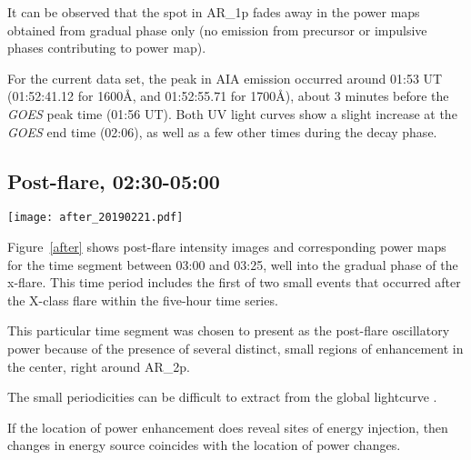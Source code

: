 It can be observed that the spot in AR\_1p fades away in the power maps
obtained from gradual phase only (no emission from precursor or impulsive
phases contributing to power map).


For the current data set, the peak in AIA emission occurred around
01:53 UT (01:52:41.12 for 1600\AA{}, and 01:52:55.71 for 1700\AA{}),
about 3 minutes before the \textit{GOES} peak time (01:56 UT).
Both UV light curves show a slight increase at the \textit{GOES} end time
(02:06), as well as a few other times during the decay phase.



\clearpage
\subsection{Post-flare, 02:30-05:00}

\begin{figure*}[htb!]\centering
    \texttt{[image: after\_20190221.pdf]}
    \caption{%
        Same as Figure~\ref{before},
        after the X-class flare between
        03:00 and 03:25 UT on 15 February 2011.
        \label{after}}
\end{figure*}

Figure~\ref{after}
shows post-flare intensity images and corresponding power maps for
the time segment between 03:00 and 03:25,
well into the gradual phase of the x-flare.
This time period includes the first of two small events that occurred
after the X-class flare within the five-hour time series.

This particular time segment was chosen to present as the post-flare
oscillatory power because of the presence of several distinct, small
regions of enhancement in the center,
right around AR\_2p.






%


The small periodicities can be difficult to extract from the global
lightcurve \citep{VanDoorsselaere2016}.

If the location of power enhancement does reveal sites of energy injection,
then  changes in energy source coincides
with the location of power changes.



